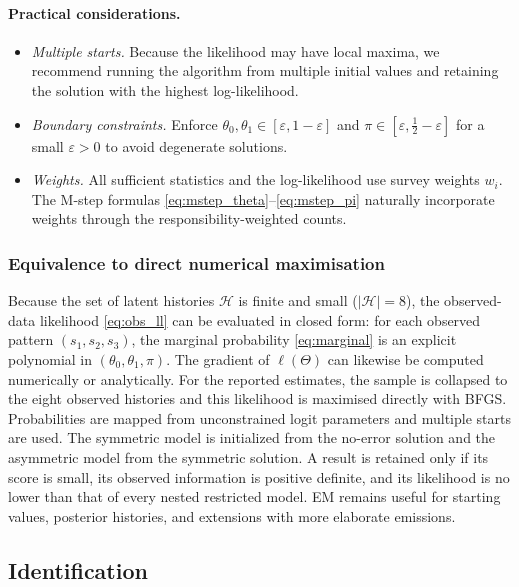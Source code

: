 \paragraph{Practical considerations.}
\begin{itemize}
\item \emph{Multiple starts.} Because the likelihood may have local
  maxima, we recommend running the algorithm from multiple initial
  values and retaining the solution with the highest log-likelihood.
\item \emph{Boundary constraints.} Enforce
  \(\theta_0, \theta_1 \in [\varepsilon, 1 - \varepsilon]\) and
  \(\pi \in [\varepsilon, \tfrac{1}{2} - \varepsilon]\) for a small
  \(\varepsilon > 0\) to avoid degenerate solutions.
\item \emph{Weights.} All sufficient statistics and the log-likelihood
  use survey weights \(w_i\). The M-step formulas
  \eqref{eq:mstep_theta}--\eqref{eq:mstep_pi} naturally incorporate
  weights through the responsibility-weighted counts.
\end{itemize}

\subsubsection{Equivalence to direct numerical maximisation}
\label{sec:direct_mle}

Because the set of latent histories \(\mathcal{H}\) is finite and small
(\(|\mathcal{H}| = 8\)), the observed-data likelihood
\eqref{eq:obs_ll} can be evaluated in closed form: for each observed
pattern \((s_1, s_2, s_3)\), the marginal probability
\eqref{eq:marginal} is an explicit polynomial in
\((\theta_0, \theta_1, \pi)\). The gradient of \(\ell(\Theta)\) can
likewise be computed numerically or analytically. For the reported estimates,
the sample is collapsed to the eight observed histories and this likelihood is
maximised directly with BFGS. Probabilities are mapped from unconstrained logit
parameters and multiple starts are used. The symmetric model is initialized
from the no-error solution and the asymmetric model from the symmetric
solution. A result is retained only if its score is small, its observed
information is positive definite, and its likelihood is no lower than that of
every nested restricted model. EM remains useful for starting values, posterior
histories, and extensions with more elaborate emissions.

\subsection{Identification}
\label{sec:identification}

